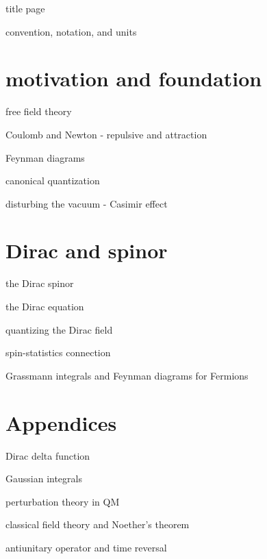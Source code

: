 \documentclass[10pt, a4paper]{report}
\numberwithin{equation}{section}
\begin{document}
	{title page}
	
	\tableofcontents
	
	\pagebreak
	
	{convention, notation, and units}
	
	\part{motivation and foundation}
	
	{free field theory}
	
	{Coulomb and Newton - repulsive and attraction}
	
	{Feynman diagrams}
	
	{canonical quantization}
	
	{disturbing the vacuum - Casimir effect}
	
	\part{Dirac and spinor} \label{part II}
	
	{the Dirac spinor}
	
	{the Dirac equation}
	
	{quantizing the Dirac field}
	
	{spin-statistics connection}
	
	{Grassmann integrals and Feynman diagrams for Fermions}
	
	\appendix
	
	\part*{Appendices}
	
	{Dirac delta function}
	
	{Gaussian integrals}
	
	{perturbation theory in QM}
	
	{classical field theory and Noether's theorem}
	
	{antiunitary operator and time reversal}
\end{document}
